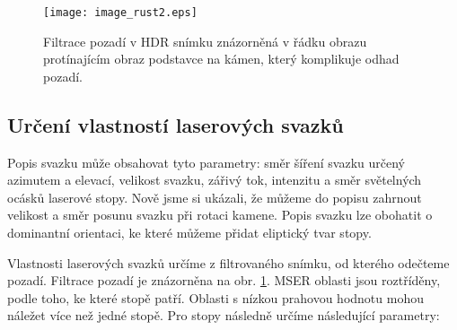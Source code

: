 \begin{figure}[htbp]
    \centering\texttt{[image: image\_rust2.eps]}
     \caption[Filtrace pozadí.]{Filtrace pozadí v HDR snímku znázorněná v řádku obrazu protínajícím obraz podstavce na kámen, který komplikuje odhad pozadí.}
        \label{fig:pozadi}
\end{figure}
	       

\subsection*{Určení vlastností laserových svazků}
Popis svazku může obsahovat tyto parametry: směr šíření svazku určený azimutem a elevací, velikost svazku, zářivý tok, intenzitu a směr světelných ocásků laserové stopy. Nově jsme si ukázali, že můžeme do popisu zahrnout velikost a směr posunu svazku při rotaci kamene. Popis svazku lze obohatit o dominantní orientaci, ke které můžeme přidat eliptický tvar stopy. 

Vlastnosti laserových svazků určíme z filtrovaného snímku, od kterého odečteme pozadí. Filtrace pozadí je znázorněna na obr. \ref{fig:pozadi}. MSER oblasti jsou roztříděny, podle toho, ke které stopě patří. Oblasti s nízkou prahovou hodnotu mohou náležet více než jedné stopě. Pro stopy   následně určíme následující parametry:


